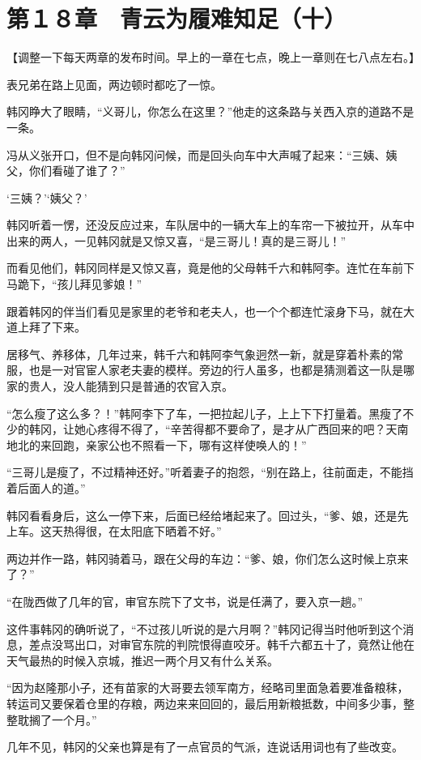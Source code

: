 \section{第１８章　青云为履难知足（十）}

【调整一下每天两章的发布时间。早上的一章在七点，晚上一章则在七八点左右。】

表兄弟在路上见面，两边顿时都吃了一惊。

韩冈睁大了眼睛，“义哥儿，你怎么在这里？”他走的这条路与关西入京的道路不是一条。

冯从义张开口，但不是向韩冈问候，而是回头向车中大声喊了起来：“三姨、姨父，你们看碰了谁了？”

‘三姨？’‘姨父？’

韩冈听着一愣，还没反应过来，车队居中的一辆大车上的车帘一下被拉开，从车中出来的两人，一见韩冈就是又惊又喜，“是三哥儿！真的是三哥儿！”

而看见他们，韩冈同样是又惊又喜，竟是他的父母韩千六和韩阿李。连忙在车前下马跪下，“孩儿拜见爹娘！”

跟着韩冈的伴当们看见是家里的老爷和老夫人，也一个个都连忙滚身下马，就在大道上拜了下来。

居移气、养移体，几年过来，韩千六和韩阿李气象迥然一新，就是穿着朴素的常服，也是一对官宦人家老夫妻的模样。旁边的行人虽多，也都是猜测着这一队是哪家的贵人，没人能猜到只是普通的农官入京。

“怎么瘦了这么多？！”韩阿李下了车，一把拉起儿子，上上下下打量着。黑瘦了不少的韩冈，让她心疼得不得了，“辛苦得都不要命了，是才从广西回来的吧？天南地北的来回跑，亲家公也不照看一下，哪有这样使唤人的！”

“三哥儿是瘦了，不过精神还好。”听着妻子的抱怨，“别在路上，往前面走，不能挡着后面人的道。”

韩冈看看身后，这么一停下来，后面已经给堵起来了。回过头，“爹、娘，还是先上车。这天热得很，在太阳底下晒着不好。”

两边并作一路，韩冈骑着马，跟在父母的车边：“爹、娘，你们怎么这时候上京来了？”

“在陇西做了几年的官，审官东院下了文书，说是任满了，要入京一趟。”

这件事韩冈的确听说了，“不过孩儿听说的是六月啊？”韩冈记得当时他听到这个消息，差点没骂出口，对审官东院的判院恨得直咬牙。韩千六都五十了，竟然让他在天气最热的时候入京城，推迟一两个月又有什么关系。

“因为赵隆那小子，还有苗家的大哥要去领军南方，经略司里面急着要准备粮秣，转运司又要保着仓里的存粮，两边来来回回的，最后用新粮抵数，中间多少事，整整耽搁了一个月。”

几年不见，韩冈的父亲也算是有了一点官员的气派，连说话用词也有了些改变。

